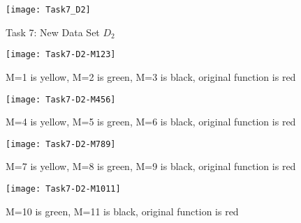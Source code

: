 \documentclass[a4paper,10pt]{article}
\begin{document}
\begin{figure}
	\centering
	\texttt{[image: Task7\_D2]}
	\caption{Task 7: New Data Set $D_2$}
	\label{fig:task7d2}
\end{figure}

\begin{figure}
	\centering
	\texttt{[image: Task7-D2-M123]}
	\caption{M=1 is yellow, M=2 is green, M=3 is black, original function is red}
	\label{fig:task7-d2-m123}
\end{figure}

\begin{figure}
	\centering
	\texttt{[image: Task7-D2-M456]}
	\caption{M=4 is yellow, M=5 is green, M=6 is black, original function is red}
	\label{fig:task7-d2-m456}
\end{figure}

\begin{figure}
	\centering
	\texttt{[image: Task7-D2-M789]}
	\caption{M=7 is yellow, M=8 is green, M=9 is black, original function is red}
	\label{fig:task7-d2-m789}
\end{figure}

\begin{figure}
	\centering
	\texttt{[image: Task7-D2-M1011]}
	\caption{M=10 is green, M=11 is black, original function is red}
	\label{fig:task7-d2-m1011}
\end{figure}
\end{document}
